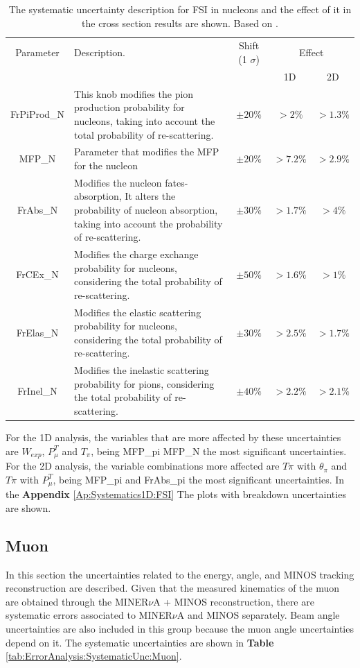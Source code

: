 \begin{table}[!htb]
    \centering
    \begin{tabular}{c|p{2in}|c|c|c}
        \hline 
        Parameter & Description.  & Shift (1 $\sigma$) & \multicolumn{2}{c}{Effect} \\
         & & & 1D & 2D \\
        \hline  
        FrPiProd\_N & This knob modifies the pion production probability for nucleons, taking into account the total probability of re-scattering. & $\pm20\%$ & $>2\%$ & $>1.3\%$\\ \hline
        MFP\_N & Parameter that modifies the MFP for the nucleon & $\pm20\%$ & $>7.2\%$ & $>2.9\%$ \\ \hline
        FrAbs\_N & Modifies the nucleon fates-absorption, It alters the probability of nucleon absorption, taking into account the probability of re-scattering. & $\pm30\%$ & $>1.7\%$ & $>4\%$ \\ \hline
        FrCEx\_N & Modifies the charge exchange probability for nucleons, considering the total probability of re-scattering. & $\pm50\%$ & $>1.6\%$ & $>1\%$\\ \hline
        FrElas\_N & Modifies the elastic scattering probability for nucleons, considering the total probability of re-scattering. & $\pm30\%$ & $>2.5\%$ & $>1.7\%$ \\ \hline
        FrInel\_N & Modifies the inelastic scattering probability for pions, considering the total probability of re-scattering. & $\pm40\%$ & $>2.2\%$ & $>2.1\%$\\ \hline
        
    \end{tabular}
    \caption{The systematic uncertainty description for FSI in nucleons and the effect of it in the cross section results are shown. Based on \cite{GENIEUnc}.}
    \label{tab:ErrorAnalysis:SystematicUnc:FSIN}
\end{table}

For the 1D analysis, the variables that are more affected by these uncertainties are $W_{exp}$, $P^T_\mu$ and $T_\pi$, being MFP\_pi MFP\_N the most significant uncertainties. For the 2D analysis, the variable combinations more affected are $T\pi$ with $\theta_\pi$ and $T\pi$ with $P^T_\mu$, being MFP\_pi and FrAbs\_pi the most significant uncertainties. In the \textbf{Appendix} \ref{Ap:Systematics1D:FSI} The plots with breakdown uncertainties are shown.


\subsection{Muon}
\label{Cap:ErrorAnalysis:SystematicUnc:Muon}
In this section the uncertainties related to the energy, angle, and MINOS tracking reconstruction are described. Given that the measured kinematics of the muon are obtained through the MINER$\nu$A + MINOS reconstruction, there are systematic errors associated to MINER$\nu$A and MINOS separately. Beam angle uncertainties are also included in this group because the muon angle uncertainties depend on it. The systematic uncertainties are shown in \textbf{Table} \ref{tab:ErrorAnalysis:SystematicUnc:Muon}.  

